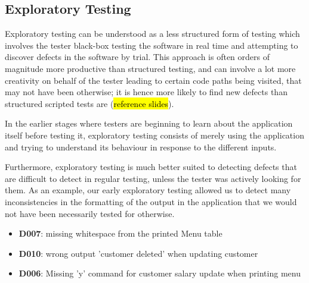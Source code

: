 \subsection{Exploratory Testing}

Exploratory testing can be understood as a less structured form of testing which involves the tester black-box testing the software in real time and attempting to discover defects in the software by trial. 
This approach is often orders of magnitude more productive than structured testing, and can involve a lot more creativity on behalf of the tester leading to certain code paths being visited, that may not have been otherwise; it is hence more likely to find new defects than structured scripted tests are (\hl{reference slides}).
\par
In the earlier stages where testers are beginning to learn about the application itself before testing it, exploratory testing consists of merely using the application and trying to understand its behaviour in response to the different inputs. 
\par
Furthermore, exploratory testing is much better suited to detecting defects that are difficult to detect in regular testing, unless the tester was actively looking for them. 
As an example, our early exploratory testing allowed us to detect many inconsistencies in the formatting of the output in the application that we would not have been necessarily tested for otherwise.  

\begin{itemize}
    \item \textbf{D007}: missing whitespace from the printed Menu table
    \item \textbf{D010}: wrong output 'customer deleted' when updating customer
    \item \textbf{D006}: Missing 'y' command for customer salary update when printing menu
\end{itemize}